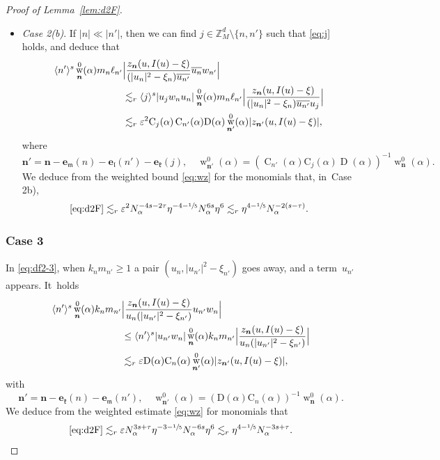 \documentclass[JEP,XML,SOM,Unicode,published]{cedram}
\DeclareMathOperator{\rw}{w}
\theoremstyle{plain}
\theoremstyle{definition}
\newcommand{\nb}{{\boldsymbol n}}
\newcommand{\Z}{\mathbb{Z}}
\newcommand{\1}{\mathbf{1}}
\let\epsilon\varepsilon
\begin{document}
\begin{proof}[Proof of Lemma~\ref{lem:d2F}]
\begin{itemize}
\item
\textit{Case 2(b)}. If
$
|n|\ll |n'|
$,
then we can find $j \in \Z_{M}^{d}\setminus\{n,n'\}$ such that \eqref{eq:j} holds, and deduce that
\begin{align*}
\langle n'\rangle^{s} \rw_{\nb}^{0}(\alpha)m_{n}\ell_{n'}
&\Bigl|
\frac{z_{\nb}(u,I(u)-\xi)}
{(|u_{n}|^{2}-\xi_{n})\overline{u_{n'}}}
\overline{u_{n}}w_{n'}
\Bigr| \\
&
\lesssim_{r}\langle j\rangle^{s}|u_{j}w_{n}u_{n}| \rw_{\nb}^{0}(\alpha)m_{n}\ell_{n'}
\Bigl|
\frac{z_{\nb}(u,I(u)-\xi)}
{(|u_{n}|^{2}-\xi_{n})\overline{u_{n'}}u_{j}}
\Bigr| \\
&\lesssim_{r}
\epsilon^{2}\mathrm{C}_{j}(\alpha)\operatorname{C}_{n'}(\alpha)\mathrm{D}(\alpha)
\rw_{\nb'}^{0}(\alpha)
|z_{\nb'}(u,I(u)-\xi)|,
\end{align*}
where
\[
\nb'=
\nb-\boldsymbol{e}_{\mathfrak{m}}(n)-\boldsymbol{e}_{\mathfrak{l}}(n')-\boldsymbol{e}_{\mathfrak{k}}(j),
\quad
\rw_{\nb'}^{0}(\alpha)=(\operatorname{C}_{n'}(\alpha)\mathrm{C}_{j}(\alpha)\operatorname{D}(\alpha))^{-1}\rw_{\nb}^{0}(\alpha).
\]
We deduce from the weighted bound \eqref{eq:wz} for the monomials that, in~Case 2b),
\[
\eqref{eq:d2F}
\lesssim_{r}\epsilon^{2}
N_{\alpha}^{-4s-2\tau}\eta^{-4-\sfrac{1}{5}}N_{\alpha}^{6s}\eta^{6}
\lesssim_{r}
\eta^{4-\sfrac{1}{5}}N_{\alpha}^{-2(s-\tau)}.
\]
\end{itemize}

\subsubsection*{Case 3} In \eqref{eq:df2-3}, when $k_{n}m_{n'}\geq1$ a pair $(u_{n},|u_{n'}|^{2}-\xi_{n'})$ goes away, and a term~$u_{n'}$ appears. It~holds
\begin{align*}
\langle n'\rangle^{s} \rw_{\nb}^{0}(\alpha)k_{n}m_{n'}
&\Bigl|\frac{z_{\nb}(u,I(u)-\xi)}{u_{n}(|u_{n'}|^{2}-\xi_{n'})}u_{n'}w_{n}\Bigr| \\
&
\leq \langle n'\rangle^{s}
|u_{n'}w_{n}|\rw_{\nb}^{0}(\alpha)k_{n}m_{n'}
\Bigl|
\frac{z_{\nb}(u,I(u)-\xi)}
{u_{n}(|u_{n'}|^{2}-\xi_{n'})}
\Bigr|
\\
&\lesssim_{r}\epsilon\mathrm{D}(\alpha)\mathrm{C}_{n}(\alpha)
\rw^{0}_{\nb'}(\alpha)|z_{\nb'}(u,I(u)-\xi)|,
\end{align*}
with
\[
\nb'
= \nb
-\boldsymbol{e}_{\mathfrak{k}}(n)
-\boldsymbol{e}_{\mathfrak{m}}(n'),\quad
\rw_{\nb'}^{0}(\alpha) = (\mathrm{D}(\alpha)\mathrm{C}_{n}(\alpha))^{-1}\rw_{\nb}^{0}(\alpha).
\]
We deduce from the weighted estimate \eqref{eq:wz} for monomials that
\[
\eqref{eq:d2F}
\lesssim_{r}
\epsilon N_{\alpha}^{3s+\tau}\eta^{-3-\sfrac{1}{5}}N_{\alpha}^{-6s}\eta^{6}
\lesssim_{r} \eta^{4-\sfrac{1}{5}}N_{\alpha}^{-3s+\tau}.
\]


\end{proof}
\end{document}
